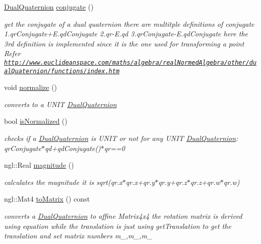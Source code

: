 \begin{DoxyCompactItemize}
\hyperlink{class_dual_quaternion}{Dual\-Quaternion} \hyperlink{class_dual_quaternion_addf33a15fb234f0645238f0654525bf5}{conjugate} ()
\begin{DoxyCompactList}\small\item\em get the conjugate of a dual quaternion there are multitple definitions of conjugate 1.\-qr\-Conjugate+\-E.qd\-Conjugate 2.\-qr-\/\-E.\-qd 3.\-qr\-Conjugate-\/\-E.\-qd\-Conjugate here the 3rd definition is implemented since it is the one used for transforming a point Refer \href{http://www.euclideanspace.com/maths/algebra/realNormedAlgebra/other/dualQuaternion/functions/index.htm}{\tt http\-://www.\-euclideanspace.\-com/maths/algebra/real\-Normed\-Algebra/other/dual\-Quaternion/functions/index.\-htm} \end{DoxyCompactList}\item 
void \hyperlink{class_dual_quaternion_a26e134694c5a2bc88ed01c3b33999cb2}{normalize} ()
\begin{DoxyCompactList}\small\item\em converts to a U\-N\-I\-T \hyperlink{class_dual_quaternion}{Dual\-Quaternion} \end{DoxyCompactList}\item 
bool \hyperlink{class_dual_quaternion_ad152ae76ed2edb035af320f88052873e}{is\-Normalized} ()
\begin{DoxyCompactList}\small\item\em checks if a \hyperlink{class_dual_quaternion}{Dual\-Quaternion} is U\-N\-I\-T or not for any U\-N\-I\-T \hyperlink{class_dual_quaternion}{Dual\-Quaternion}\-: qr\-Conjugate$\ast$qd+qd\-Conjugate()$\ast$qr==0 \end{DoxyCompactList}\item 
ngl\-::\-Real \hyperlink{class_dual_quaternion_aad8fbdc4d9eab19d7971dc6aef306558}{magnitude} ()
\begin{DoxyCompactList}\small\item\em calculates the magnitude it is sqrt(qr.\-x$\ast$qr.x+qr.y$\ast$qr.y+qr.z$\ast$qr.z+qr.w$\ast$qr.w) \end{DoxyCompactList}\item 
ngl\-::\-Mat4 \hyperlink{class_dual_quaternion_abce89499fc871e4a26bf34e148d2ae2e}{to\-Matrix} () const 
\begin{DoxyCompactList}\small\item\em converts a \hyperlink{class_dual_quaternion}{Dual\-Quaternion} to affine Matrix4x4 the rotation matrix is derived using equation while the translation is just using get\-Translation to get the translation and set matrix numbers m\-\_,m\-\_,m\-\_ \end{DoxyCompactList}\item 

\end{DoxyCompactItemize}
